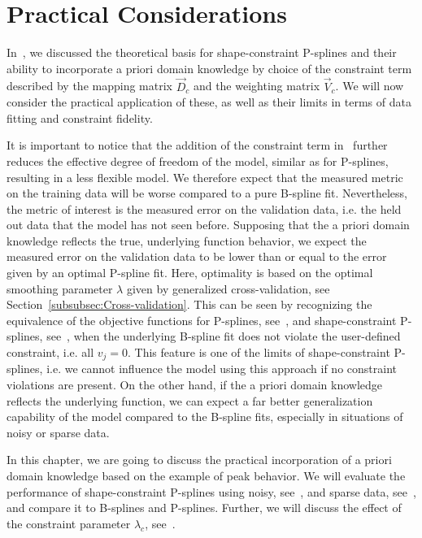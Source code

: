 \chapter{Practical Considerations}

In~, we discussed the theoretical basis for shape-constraint P-splines and their ability to incorporate a priori domain knowledge by choice of the constraint term described by the mapping matrix $\vec{D}_c$ and the weighting matrix $\vec{V}_c$. We will now consider the practical application of these, as well as their limits in terms of data fitting and constraint fidelity. 

It is important to notice that the addition of the constraint term in~ further reduces the effective degree of freedom of the model, similar as for P-splines, resulting in a less flexible model. We therefore expect that the measured metric on the training data will be worse compared to a pure B-spline fit. Nevertheless, the metric of interest is the measured error on the validation data, i.e. the held out data that the model has not seen before. Supposing that the a priori domain knowledge reflects the true, underlying function behavior, we expect the measured error on the validation data to be lower than or equal to the error given by an optimal P-spline fit. Here, optimality is based on the optimal smoothing parameter $\lambda$ given by generalized cross-validation, see Section~\ref{subsubsec:Cross-validation}. This can be seen by recognizing the equivalence of the objective functions for P-splines, see~, and shape-constraint P-splines, see~, when the underlying B-spline fit does not violate the user-defined constraint, i.e. all $v_j=0$. This feature is one of the limits of shape-constraint P-splines, i.e. we cannot influence the model using this approach if no constraint violations are present. On the other hand, if the a priori domain knowledge reflects the underlying function, we can expect a far better generalization capability of the model compared to the B-spline fits, especially in situations of noisy or sparse data.

In this chapter, we are going to discuss the practical incorporation of a priori domain knowledge based on the example of peak behavior. We will evaluate the performance of shape-constraint P-splines using noisy, see~, and sparse data, see~, and compare it to B-splines and P-splines. Further, we will discuss the effect of the constraint parameter $\lambda_c$, see~.


